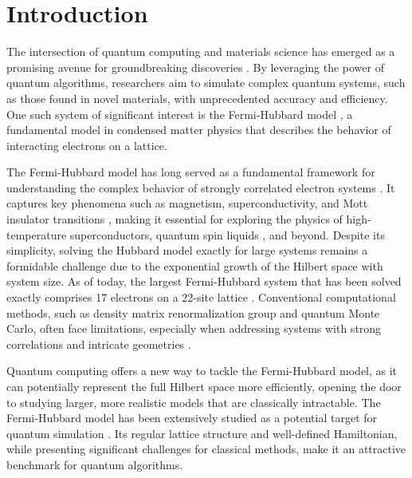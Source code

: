 \documentclass[twocolumn,superscriptaddress,amsmath,amssymb,showpacs,floatfix,preprintnumbers]{revtex4-1}
\begin{document}

\section{Introduction} \label{s_intro}

The intersection of quantum computing and materials science has emerged as a promising avenue for
groundbreaking discoveries \cite{Georgescu2014,Bauer2016,Bauer2020}. 
%
By leveraging the power of quantum algorithms, researchers aim to simulate complex quantum systems, 
such as those found in novel materials, with unprecedented accuracy and efficiency. 
%
One such system of significant interest is the Fermi-Hubbard model  \cite{Hubbard1963}, 
a fundamental model in condensed matter physics that describes the behavior of 
interacting electrons on a lattice.

The Fermi-Hubbard model has long served as a fundamental framework for understanding 
the complex behavior of strongly correlated electron systems
\cite{Essler2005,Scalapino2007,Scalapino2012,LeBlanc2015,Qin2022}.
%
It captures key phenomena such as magnetism, superconductivity, and Mott insulator transitions
\cite{Mott1949}, making it essential for exploring the physics of high-temperature superconductors, 
quantum spin liquids \cite{Lee2008}, and beyond.
%
Despite its simplicity, solving the Hubbard model exactly for large systems remains a formidable 
challenge due to the exponential growth of the Hilbert space with system size. 
%
As of today, the largest Fermi-Hubbard system that has been solved exactly comprises 17 
electrons on a 22-site lattice \cite{Yamada2005}.
%
Conventional computational methods, such as density matrix renormalization group and quantum 
Monte Carlo, often face limitations, especially when addressing systems with strong correlations 
and intricate geometries \cite{Schollwock2005,Stoudenmire2011}.

Quantum computing offers a new way to tackle the Fermi-Hubbard model, as it can potentially represent 
the full Hilbert space more efficiently, opening the door to studying larger, more realistic models 
that are classically intractable.
%
The Fermi-Hubbard model has been extensively studied as a potential target for quantum simulation
\cite{Somma2002,Wecker2015s,Wecker2015p,Jiang2018,Reiner2019,Cade2020,Cai2020,Demers2020,Martin2022,
	Gard2022,Stanisic2022,Ayral2023}.
%
Its regular lattice structure and well-defined Hamiltonian, while presenting significant challenges 
for classical methods, make it an attractive benchmark for quantum algorithms.
\end{document}

